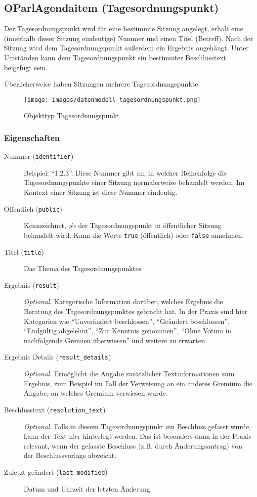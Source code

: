 \documentclass[,a4paper]{article}
\makeatletter
\def\maxwidth{\ifdim\Gin@nat@width>\linewidth\linewidth
\else\Gin@nat@width\fi}
\let\Oldincludegraphics\includegraphics
\renewcommand{\includegraphics}[1]{\Oldincludegraphics[width=\maxwidth]{#1}}
\makeatother
\begin{document}
\subsection{OParlAgendaitem (Tagesordnungspunkt)}

Der Tagesordnungspunkt wird für eine bestimmte Sitzung angelegt, erhält
eine (innerhalb dieser Sitzung eindeutige) Nummer und einen Titel
(Betreff). Nach der Sitzung wird dem Tagesordnungspunkt außerdem ein
Ergebnis angehängt. Unter Umständen kann dem Tagesordnungspunkt ein
bestimmter Beschlusstext beigefügt sein.

Überlicherweise haben Sitzungen mehrere Tagesordnungspunkte.

\begin{figure}[htbp]
\centering
\texttt{[image: images/datenmodell\_tagesordnungspunkt.png]}
\caption{Objekttyp Tagesordnungspunkt}
\end{figure}

\subsubsection{Eigenschaften}

\begin{description}
\item[Nummer (\texttt{identifier})]
Beispiel: ``1.2.3''. Diese Nummer gibt an, in welcher Reihenfolge die
Tagesordnungspunkte einer Sitzung normalerweise behandelt werden. Im
Kontext einer Sitzung ist diese Nummer eindeutig.
\item[Öffentlich (\texttt{public})]
Kennzeichnet, ob der Tagesordnungspunkt in öffentlicher Sitzung
behandelt wird. Kann die Werte \texttt{true} (öffentlich) oder
\texttt{false} annehmen.
\item[Titel (\texttt{title})]
Das Thema des Tagesordnungspunktes
\item[Ergebnis (\texttt{result})]
\emph{Optional}. Kategorische Information darüber, welches Ergebnis die
Beratung des Tagesordnungspunktes gebracht hat. In der Praxis sind hier
Kategorien wie ``Unverändert beschlossen'', ``Geändert beschlossen'',
``Endgültig abgelehnt'', ``Zur Kenntnis genommen'', ``Ohne Votum in
nachfolgende Gremien überwiesen'' und weitere zu erwarten.
\item[Ergebnis Details (\texttt{result\_details})]
\emph{Optional}. Ermöglicht die Angabe zusätzlicher Textinformationen
zum Ergebnis, zum Beispiel im Fall der Verweisung an ein anderes Gremium
die Angabe, an welches Gremium verwiesen wurde.
\item[Beschlusstext (\texttt{resolution\_text})]
\emph{Optional}. Falls in diesem Tagesordnungspunkt ein Beschluss
gefasst wurde, kann der Text hier hinterlegt werden. Das ist besonders
dann in der Praxis relevant, wenn der gefasste Beschluss (z.B. durch
Änderungsantrag) von der Beschlussvorlage abweicht.
\item[Zuletzt geändert (\texttt{last\_modified})]
Datum und Uhrzeit der letzten Änderung
\end{description}
\end{document}
